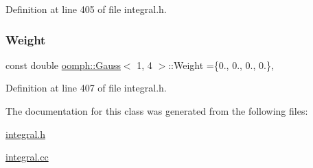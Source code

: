 Definition at line 405 of file integral.\+h.

\mbox{\label{classoomph_1_1Gauss_3_011_00_014_01_4_ac9b359ac61413b7d472d9ccf0f5b9786}} 
\subsubsection{\texorpdfstring{Weight}{Weight}}
{\footnotesize\ttfamily const double \hyperlink{classoomph_1_1Gauss}{oomph\+::\+Gauss}$<$ 1, 4 $>$\+::Weight =\{0., 0., 0., 0.\}\hspace{0.3cm}{\ttfamily [static]}, {\ttfamily [private]}}



Definition at line 407 of file integral.\+h.



The documentation for this class was generated from the following files\+:\begin{DoxyCompactItemize}
\item 
\hyperlink{integral_8h}{integral.\+h}\item 
\hyperlink{integral_8cc}{integral.\+cc}\end{DoxyCompactItemize}
